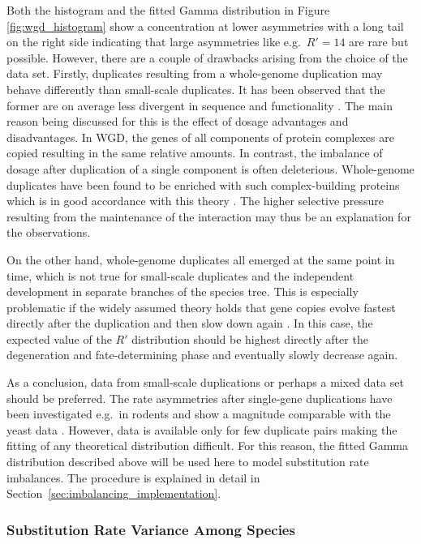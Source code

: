 \documentclass[hidelinks,11pt]{scrreprt}
\begin{document}
Both the histogram and the fitted Gamma distribution in Figure \ref{fig:wgd_histogram} show a concentration at lower asymmetries with a long tail on the right side indicating that large asymmetries like e.g.\ $R'=14$ are rare but possible. However, there are a couple of drawbacks arising from the choice of the data set. Firstly, duplicates resulting from a whole-genome duplication may behave differently than small-scale duplicates. It has been observed that the former are on average less divergent in sequence and functionality \citep{hakes2007}. The main reason being discussed for this is the effect of dosage advantages and disadvantages. In WGD, the genes of all components of protein complexes are copied resulting in the same relative amounts. In contrast, the imbalance of dosage after duplication of a single component is often deleterious. Whole-genome duplicates have been found to be enriched with such complex-building proteins which is in good accordance with this theory \citep{papp2003}. The higher selective pressure resulting from the maintenance of the interaction may thus be an explanation for the observations.

On the other hand, whole-genome duplicates all emerged at the same point in time, which is not true for small-scale duplicates and the independent development in separate branches of the species tree. This is especially problematic if the widely assumed theory holds that gene copies evolve fastest directly after the duplication and then slow down again \citep{jordan2004,innan2010}. In this case, the expected value of the $R'$ distribution should be highest directly after the degeneration and fate-determining phase and eventually slowly decrease again.

As a conclusion, data from small-scale duplications or perhaps a mixed data set should be preferred. The rate asymmetries after single-gene duplications have been investigated e.g.\ in rodents and show a magnitude comparable with the yeast data \citep{cusack2006,gayral2007}. However, data is available only for few duplicate pairs making the fitting of any theoretical distribution difficult. For this reason, the fitted Gamma distribution described above will be used here to model substitution rate imbalances. The procedure is explained in detail in Section~\ref{sec:imbalancing_implementation}.

\subsubsection{Substitution Rate Variance Among Species}
\label{sec:autocorrelation}
\end{document}
